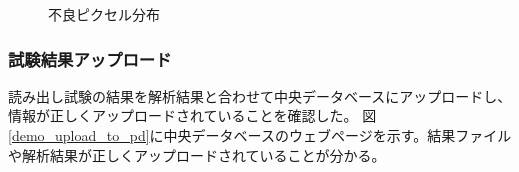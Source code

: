 \begin{figure}[bpt]
\caption[不良ピクセル分布]{不良ピクセル分布}
\label{pixel_analysis_result_figure_dist}
\end{figure}

\clearpage
\subsubsection{試験結果アップロード}
読み出し試験の結果を解析結果と合わせて中央データベースにアップロードし、情報が正しくアップロードされていることを確認した。
図\ref{demo_upload_to_pd}に中央データベースのウェブページを示す。結果ファイルや解析結果が正しくアップロードされていることが分かる。
